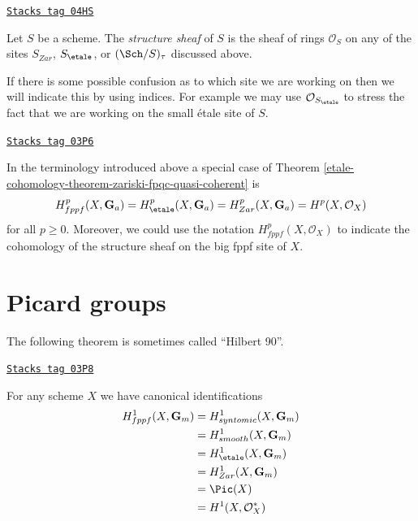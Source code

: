 \begin{definition}
\label{etale-cohomology-definition-structure-sheaf}
\href{https://stacks.math.columbia.edu/tag/04HS}{\texttt{Stacks tag 04HS}}

Let $S$ be a scheme. The {\it structure sheaf} of $S$ is the sheaf of rings
$\mathcal{O}_S$
on any of the sites $S_{Zar}$, $S_\etale$, or $(\Sch/S)_\tau$
discussed above.
\end{definition}

If there is some possible confusion as to which site we are working on
then we will indicate this by using indices. For example we may use
$\mathcal{O}_{S_\etale}$ to stress the fact that we are working on the
small \'etale site of $S$.

\begin{remark}
\label{etale-cohomology-remark-special-case-fpqc-cohomology-quasi-coherent}
\href{https://stacks.math.columbia.edu/tag/03P6}{\texttt{Stacks tag 03P6}}

In the terminology introduced above a special case of
Theorem \ref{etale-cohomology-theorem-zariski-fpqc-quasi-coherent}
is
$$
H_{fppf}^p(X, \mathbf{G}_a) =
H_\etale^p(X, \mathbf{G}_a) =
H_{Zar}^p(X, \mathbf{G}_a) =
H^p(X, \mathcal{O}_X)
$$
for all $p \geq 0$. Moreover, we could use the notation
$H^p_{fppf}(X, \mathcal{O}_X)$ to indicate the cohomology of the
structure sheaf on the big fppf site of $X$.
\end{remark}

\section{Picard groups}
\label{etale-cohomology-section-picard-groups}
The following theorem is sometimes called ``Hilbert 90''.

\begin{theorem}
\label{etale-cohomology-theorem-picard-group}
\href{https://stacks.math.columbia.edu/tag/03P8}{\texttt{Stacks tag 03P8}}

For any scheme $X$ we have canonical identifications
\begin{align*}
H_{fppf}^1(X, \mathbf{G}_m) & = H^1_{syntomic}(X, \mathbf{G}_m) \\
& = H^1_{smooth}(X, \mathbf{G}_m) \\
& = H_\etale^1(X, \mathbf{G}_m) \\
& = H^1_{Zar}(X, \mathbf{G}_m) \\
& = \Pic(X) \\
& = H^1(X, \mathcal{O}_X^*)
\end{align*}
\end{theorem}

